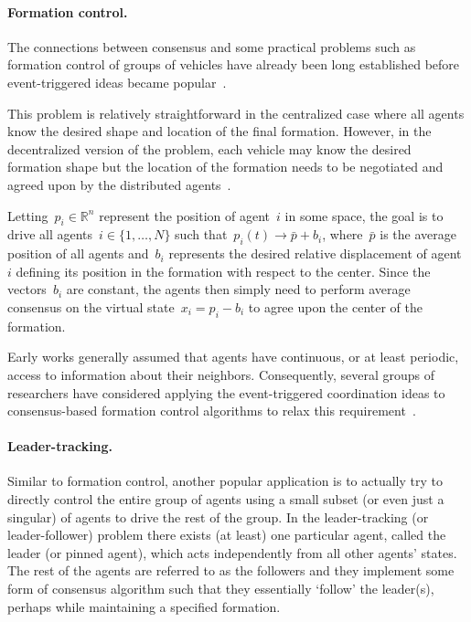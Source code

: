 \documentclass{autart}
\newcommand{\real}{{\mathbb{R}}}
\newcommand{\until}[1]{\{1,\dots, #1\}}
\begin{document}
\paragraph*{Formation control.} The connections between consensus and
some practical problems such as formation control of groups of
vehicles have already been long established before event-triggered
ideas became popular~\citep{WR-RWB:08,WR-EA:07}. {This problem is relatively straightforward
in the centralized case where all agents know the desired shape and location of the
final formation. However, in the decentralized version of the problem, each vehicle 
may know the desired formation shape but the location of the formation needs to be
negotiated and agreed upon by the distributed agents~\citep{WR-RWB-EMA:07}. 

Letting~$p_i \in \real^n$ represent the position of agent~$i$ in some
space, the goal is to drive all agents~$i \in \until{N}$ such
that~$p_i(t) \rightarrow \bar{p} + b_i$, where~$\bar{p}$ is the
average position of all agents and~$b_i$ represents the desired
relative displacement of agent~$i$ defining its position in the
formation with respect to the center. Since the vectors~$b_i$ are
constant, the agents then simply need to perform average consensus on
the virtual state~$x_i = p_i - b_i$ to agree upon the center of the
formation.}  Early works generally assumed that agents have
continuous, or at least periodic, access to information about their
neighbors. Consequently, several groups of researchers have considered
applying the event-triggered coordination ideas to consensus-based
{formation control} algorithms to relax this
requirement~\citep{XC-ZP-GW-AR:17,CN-GJP:16,AA-DL-DVD-KHJ:17}.

\paragraph*{Leader-tracking.} Similar to formation control, another
popular application is to actually try to directly control the entire
group of agents using a small subset (or even just a singular) of
agents to drive the rest of the group. In the {leader-tracking (or
  leader-follower)} problem there exists (at least) one particular
agent, called the leader (or pinned agent), which acts independently
from all other agents' states. The rest of the agents are referred to
as the followers and they implement some form of consensus algorithm
such that they essentially `follow' the leader(s), perhaps while
maintaining a specified formation.  
\end{document}
